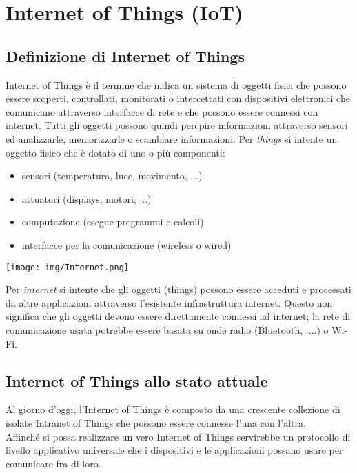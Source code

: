 \documentclass{article}
\begin{document}
\section{Internet of Things (IoT)}
\subsection{Definizione di Internet of Things}
Internet of Things è il termine che indica un sistema di oggetti fisici che possono essere scoperti, controllati, monitorati o intercettati con dispositivi elettronici che comunicano attraverso interfacce di rete e che possono essere connessi con internet.
Tutti gli oggetti possono quindi percpire informazioni attraverso sensori ed analizzarle, memorizzarle o scambiare informazioni.
Per \textit{things} si intente un oggetto fisico che è dotato di uno o più componenti:
\begin{itemize}
\item sensori (temperatura, luce, movimento, ...)
\item attuatori (displays, motori, ...)
\item computazione (esegue programmi e calcoli)
\item interfacce per la comunicazione (wireless o wired)
\end{itemize}
\begin{center}
\texttt{[image: img/Internet.png]}\\
\end{center}
Per \textit{internet} si intente che gli oggetti (things) possono essere acceduti e processati da altre applicazioni attraverso l'esistente infrastruttura internet. Questo non significa che gli oggetti devono essere direttamente connessi ad internet; la rete di comunicazione usata potrebbe essere basata su onde radio (Bluetooth, ....) o Wi-Fi.
\subsection{Internet of Things allo stato attuale}
Al giorno d'oggi, l'Internet of Things è composto da una crescente collezione di isolate Intranet of Things che possono essere connesse l'una con l'altra. \\
Affinché si possa realizzare un vero Internet of Things servirebbe un protocollo di livello applicativo universale che i dispositivi e le applicazioni possano usare per comunicare fra di loro. 
\end{document}
